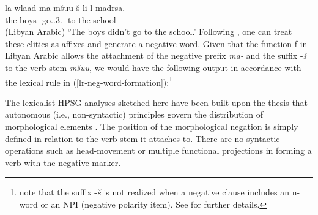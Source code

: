 \documentclass[output=paper
 	        ,biblatex
                ,babelshorthands
                ,newtxmath
                ,draftmode
                ,colorlinks, citecolor=brown
]{langscibook}
\begin{document}
\begin{exe}
\begin{xlist}
\begin{exe}
\begin{xlist}
\ea
\gll la-wlaad ma-m\u{s}uu-\u{s} li-l-madrsa. \\
     the-boys \NEG-go.\pst.3.\pl-\NEG{} to-the-school\\\hfill(Libyan Arabic)
\glt `The boys didn't go to the school.'
\z
%
Following \citet[]{BK:12}, one can treat these clitics as affixes and generate
a negative word. Given that the function f in Libyan Arabic allows
the attachment of the negative prefix \textit{ma-} and the suffix -\textit{\u{s}} to the verb
stem \emph{m\u{s}uu}, we would have the following output in accordance
with the lexical rule in (\ref{lr-neg-word-formation}):\footnote{%
   \citet{BK:12} note that the suffix -\textit{\u{s}} is not realized when a negative clause
   includes an n-word or an NPI (negative polarity item). See \citet{BK:12} for further details.}
%
%


\ea
\z

The lexicalist HPSG analyses sketched here have been built upon the
thesis that autonomous (i.e., non-syntactic) principles govern the
distribution of morphological elements \citep{BM:95}.
The position of the morphological negation is simply
defined in relation to
the verb stem it attaches to. There are no syntactic operations such
as head-movement or multiple functional projections in forming
a verb with the negative marker.




\end{xlist}
\end{exe}
\end{xlist}
\end{exe}
\end{document}
